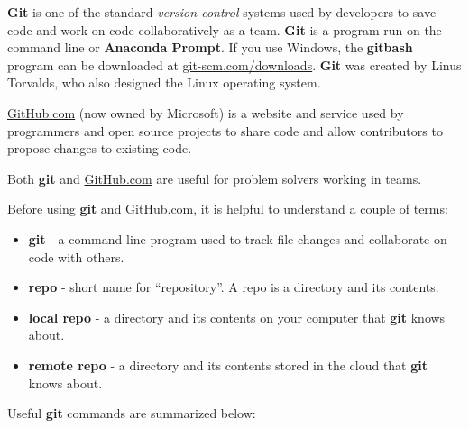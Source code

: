 \documentclass{book}
\providecommand{\tightlist}{%
      \setlength{\itemsep}{0pt}\setlength{\parskip}{0pt}}
\begin{document}
    
        \textbf{Git} is one of the standard \emph{version-control} systems used
by developers to save code and work on code collaboratively as a team.
\textbf{Git} is a program run on the command line or \textbf{Anaconda
Prompt}. If you use Windows, the \textbf{gitbash} program can be
downloaded at
\href{https://git-scm.com/downloads}{git-scm.com/downloads}.
\textbf{Git} was created by Linus Torvalds, who also designed the Linux
operating system.
    




    
        \href{https://github.com/}{GitHub.com} (now owned by Microsoft) is a
website and service used by programmers and open source projects to
share code and allow contributors to propose changes to existing code.
    




    
        Both \textbf{git} and \href{https://github.com/}{GitHub.com} are useful
for problem solvers working in teams.
    




    
        Before using \textbf{git} and GitHub.com, it is helpful to understand a
couple of terms:

\begin{itemize}
\tightlist
\item
  \textbf{git} - a command line program used to track file changes and
  collaborate on code with others.
\item
  \textbf{repo} - short name for ``repository''. A repo is a directory
  and its contents.
\item
  \textbf{local repo} - a directory and its contents on your computer
  that \textbf{git} knows about.
\item
  \textbf{remote repo} - a directory and its contents stored in the
  cloud that \textbf{git} knows about.
\end{itemize}
    




    
        Useful \textbf{git} commands are summarized below:
\end{document}
